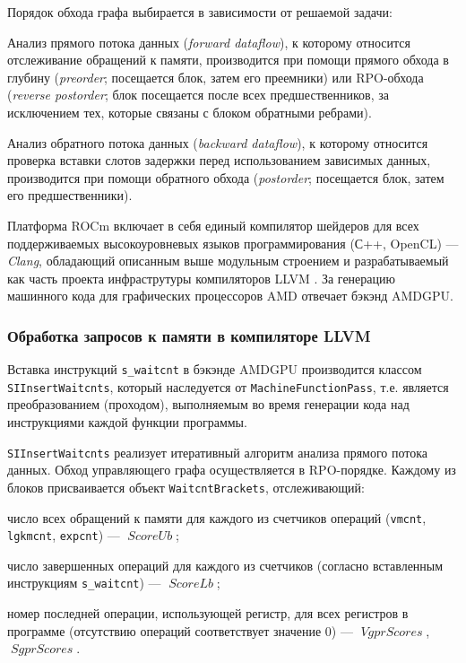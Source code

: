 \documentclass[a4paper,14pt]{extarticle}
\newcommand{\var}[1]{\mathop{\mathit{#1}}}
\begin{document}
{Порядок обхода графа выбирается в зависимости от решаемой задачи:
\begin{ul}
\item Анализ прямого потока данных (\textit{forward dataflow}), к которому относится отслеживание обращений
  к памяти, производится при помощи прямого обхода в глубину (\textit{preorder}; посещается блок, затем его преемники) или RPO-обхода (\textit{reverse postorder}; блок посещается после всех предшественников, за исключением тех, которые связаны с блоком обратными ребрами).

\item Анализ обратного потока данных (\textit{backward dataflow}), к которому относится проверка вставки
слотов задержки перед использованием зависимых данных, производится при помощи обратного обхода
(\textit{postorder}; посещается блок, затем его предшественники).
\end{ul}

Платформа ROCm включает в себя единый компилятор шейдеров для всех поддерживаемых
высокоуровневых языков программирования (С++, OpenCL) — \textit{Clang}, обладающий
описанным выше модульным строением и разрабатываемый как часть проекта
инфраструтуры компиляторов LLVM \cite{llvm-12}.
За генерацию машинного кода для графических процессоров AMD отвечает бэкэнд AMDGPU.

\subsubsection{Обработка запросов к памяти в компиляторе LLVM}
\label{section:gcn-waitcnt-llvm}

Вставка инструкций \verb|s_waitcnt| в бэкэнде AMDGPU производится классом \verb|SIInsertWaitcnts|,
который наследуется от \verb|MachineFunctionPass|, т.е. является преобразованием
(проходом), выполняемым во время генерации кода над инструкциями каждой функции программы.

\verb|SIInsertWaitcnts| реализует итеративный алгоритм анализа прямого потока данных.
Обход управляющего графа осуществляется в RPO-порядке. Каждому из блоков присваивается
объект \verb|WaitcntBrackets|, отслеживающий:
\begin{ul}
\item число всех обращений к памяти для каждого из счетчиков операций
  (\verb|vmcnt|, \verb|lgkmcnt|, \verb|expcnt|) — $\var{ScoreUb}$;
\item число завершенных операций для каждого из счетчиков (согласно
  вставленным инструкциям \verb|s_waitcnt|) — $\var{ScoreLb}$;
\item номер последней операции, использующей регистр, для всех регистров
  в программе (отсутствию операций соответствует значение $0$) — $\var{VgprScores}$, $\var{SgprScores}$.
\end{ul}

}
\end{document}
